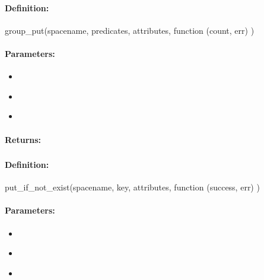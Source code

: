 \paragraph{Definition:}
\begin{javascriptcode}
group_put(spacename, predicates, attributes, function (count, err) {})
\end{javascriptcode}
\paragraph{Parameters:}
\begin{itemize}[noitemsep]
\item {}\\

\item {}\\

\item {}\\

\end{itemize}

\paragraph{Returns:}


\pagebreak
\subsubsection{}
\label{api:nodejs:put_if_not_exist}


\paragraph{Definition:}
\begin{javascriptcode}
put_if_not_exist(spacename, key, attributes, function (success, err) {})
\end{javascriptcode}
\paragraph{Parameters:}
\begin{itemize}[noitemsep]
\item {}\\

\item {}\\

\item {}\\

\end{itemize}

